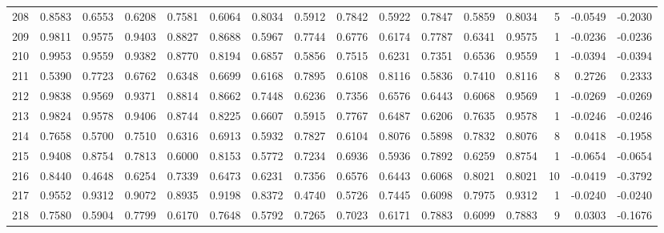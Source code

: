 \begin{tabular}{lrrrrrrrrrrrrrrr}
208 &      0.8583 &  0.6553 &  0.6208 &  0.7581 &  0.6064 &  0.8034 &  0.5912 &  0.7842 &  0.5922 &  0.7847 &   0.5859 &     0.8034 &      5 &                   -0.0549 &                    -0.2030 \\
209 &      0.9811 &  0.9575 &  0.9403 &  0.8827 &  0.8688 &  0.5967 &  0.7744 &  0.6776 &  0.6174 &  0.7787 &   0.6341 &     0.9575 &      1 &                   -0.0236 &                    -0.0236 \\
210 &      0.9953 &  0.9559 &  0.9382 &  0.8770 &  0.8194 &  0.6857 &  0.5856 &  0.7515 &  0.6231 &  0.7351 &   0.6536 &     0.9559 &      1 &                   -0.0394 &                    -0.0394 \\
211 &      0.5390 &  0.7723 &  0.6762 &  0.6348 &  0.6699 &  0.6168 &  0.7895 &  0.6108 &  0.8116 &  0.5836 &   0.7410 &     0.8116 &      8 &                    0.2726 &                     0.2333 \\
212 &      0.9838 &  0.9569 &  0.9371 &  0.8814 &  0.8662 &  0.7448 &  0.6236 &  0.7356 &  0.6576 &  0.6443 &   0.6068 &     0.9569 &      1 &                   -0.0269 &                    -0.0269 \\
213 &      0.9824 &  0.9578 &  0.9406 &  0.8744 &  0.8225 &  0.6607 &  0.5915 &  0.7767 &  0.6487 &  0.6206 &   0.7635 &     0.9578 &      1 &                   -0.0246 &                    -0.0246 \\
214 &      0.7658 &  0.5700 &  0.7510 &  0.6316 &  0.6913 &  0.5932 &  0.7827 &  0.6104 &  0.8076 &  0.5898 &   0.7832 &     0.8076 &      8 &                    0.0418 &                    -0.1958 \\
215 &      0.9408 &  0.8754 &  0.7813 &  0.6000 &  0.8153 &  0.5772 &  0.7234 &  0.6936 &  0.5936 &  0.7892 &   0.6259 &     0.8754 &      1 &                   -0.0654 &                    -0.0654 \\
216 &      0.8440 &  0.4648 &  0.6254 &  0.7339 &  0.6473 &  0.6231 &  0.7356 &  0.6576 &  0.6443 &  0.6068 &   0.8021 &     0.8021 &     10 &                   -0.0419 &                    -0.3792 \\
217 &      0.9552 &  0.9312 &  0.9072 &  0.8935 &  0.9198 &  0.8372 &  0.4740 &  0.5726 &  0.7445 &  0.6098 &   0.7975 &     0.9312 &      1 &                   -0.0240 &                    -0.0240 \\
218 &      0.7580 &  0.5904 &  0.7799 &  0.6170 &  0.7648 &  0.5792 &  0.7265 &  0.7023 &  0.6171 &  0.7883 &   0.6099 &     0.7883 &      9 &                    0.0303 &                    -0.1676 \\

\end{tabular}

